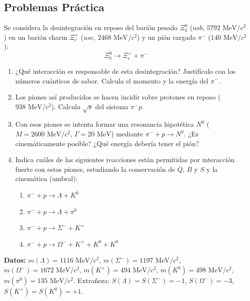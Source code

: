 \subsection{Problemas Práctica}
\begin{problema}
Se considera la desintegración en reposo del barión pesado $\Xi_b^0$ ($usb$, $5792\text{ MeV}/c^2$) en un barión charm $\Xi_c^+$ ($usc$, $2468\text{ MeV}/c^2$) y un pión cargado $\pi^-$ ($140\text{ MeV}/c^2$):
\begin{equation*}
\Xi_b^0 \longrightarrow \Xi_c^+ + \pi^-
\end{equation*}

\begin{enumerate}[label=\alph*)]
    \item ¿Qué interacción es responsable de esta desintegración? Justifícalo con los números cuánticos de sabor. Calcula el momento y la energía del $\pi^-$.
    \item Los piones así producidos se hacen incidir sobre protones en reposo ($938\text{ MeV}/c^2$). Calcula $\sqrt{s}$ del sistema $\pi^- p$.
    \item Con esos piones se intenta formar una resonancia hipotética $N^0$ ($M = 2600\text{ MeV}/c^2$, $\Gamma = 20\text{ MeV}$) mediante $\pi^- + p \to N^0$. ¿Es cinemáticamente posible? ¿Qué energía debería tener el pión?
    \item Indica cuáles de las siguientes reacciones están permitidas por interacción fuerte con estos piones, estudiando la conservación de $Q$, $B$ y $S$ y la cinemática (umbral):
    \begin{enumerate}[label=\roman*)]
        \item $\pi^- + p \longrightarrow \Lambda + K^0$
        \item $\pi^- + p \longrightarrow \Lambda + \pi^0$
        \item $\pi^- + p \longrightarrow \Sigma^- + K^+$
        \item $\pi^- + p \longrightarrow \Omega^- + K^+ + K^0 + K^0$
    \end{enumerate}
\end{enumerate}

\textbf{Datos:} $m(\Lambda) = 1116\text{ MeV}/c^2$, $m(\Sigma^-) = 1197\text{ MeV}/c^2$, $m(\Omega^-) = 1672\text{ MeV}/c^2$, $m(K^+) = 494\text{ MeV}/c^2$, $m(K^0) = 498\text{ MeV}/c^2$, $m(\pi^0) = 135\text{ MeV}/c^2$. Extrañeza: $S(\Lambda) = S(\Sigma^-) = -1$, $S(\Omega^-) = -3$, $S(K^+) = S(K^0) = +1$.


\end{problema}
